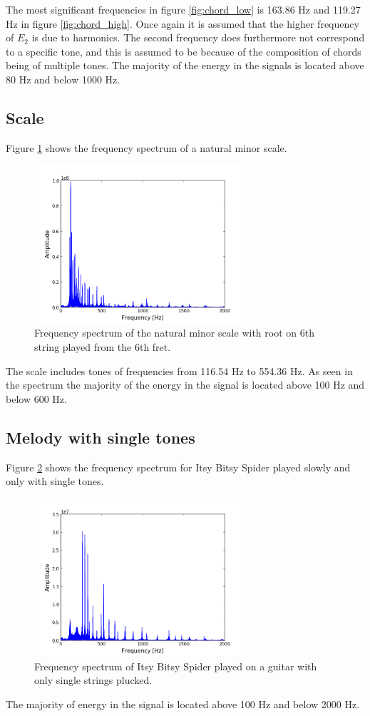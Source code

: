 The most significant frequencies in figure \ref{fig:chord_low} is 163.86 Hz and 119.27 Hz in figure \ref{fig:chord_high}. Once again it is assumed that the higher frequency of $E_2$ is due to harmonics. The second frequency does furthermore not correspond to a specific tone, and this is assumed to be because of the composition of chords being of multiple tones. The majority of the energy in the signals is located above 80 Hz and below 1000 Hz.
\subsection{Scale}
Figure \ref{fig:scale_fast} shows the frequency spectrum of a natural minor scale.
\begin{figure}[H]
\centering
\includegraphics[width=0.7\textwidth]{figures/freqanal/scale_fast.png}
\caption{Frequency spectrum of the natural minor scale with root on 6th string played from the 6th fret.}
\label{fig:scale_fast}
\end{figure}
The scale includes tones of frequencies from 116.54 Hz to 554.36 Hz. As seen in the spectrum the majority of the energy in the signal is located above 100 Hz and below 600 Hz.

\subsection{Melody with single tones}
Figure \ref{fig:melody_single} shows the frequency spectrum for Itsy Bitsy Spider played slowly and only with single tones.
\begin{figure}[H]
\centering
\includegraphics[width=0.7\textwidth]{figures/freqanal/melody_single.png}
\caption{Frequency spectrum of Itsy Bitsy Spider played on a guitar with only single strings plucked.}
\label{fig:melody_single}
\end{figure}
The majority of energy in the signal is located above 100 Hz and below 2000 Hz.

